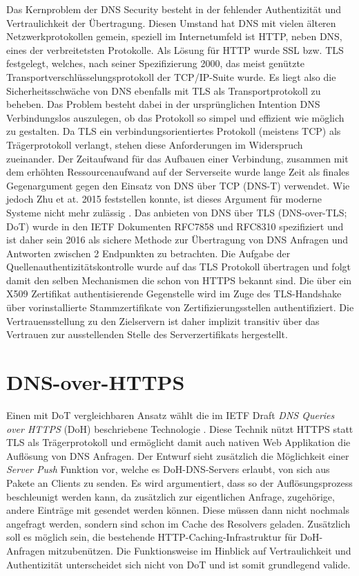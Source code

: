 Das Kernproblem der DNS Security besteht in der fehlender Authentizität und Vertraulichkeit der Übertragung. Diesen Umstand hat DNS mit vielen älteren Netzwerkprotokollen gemein, speziell im Internetumfeld ist HTTP, neben DNS, eines der verbreitetsten Protokolle. Als Lösung für HTTP wurde SSL bzw. TLS festgelegt, welches, nach seiner Spezifizierung 2000, das meist genützte Transportverschlüsselungsprotokoll der TCP/IP-Suite wurde. Es liegt also die Sicherheitsschwäche von DNS ebenfalls mit TLS als Transportprotokoll zu beheben. Das Problem besteht dabei in der ursprünglichen Intention DNS Verbindungslos auszulegen, ob das Protokoll so simpel und effizient wie möglich zu gestalten. Da TLS ein verbindungsorientiertes Protokoll (meistens TCP) als Trägerprotokoll verlangt, stehen diese Anforderungen im Widerspruch zueinander. Der Zeitaufwand für das Aufbauen einer Verbindung, zusammen mit dem erhöhten Ressourcenaufwand auf der Serverseite wurde lange Zeit als finales Gegenargument gegen den Einsatz von DNS über TCP (DNS-T) verwendet. Wie jedoch Zhu et at. 2015 feststellen konnte, ist dieses Argument für moderne Systeme nicht mehr zulässig \cite{Zhu2015}. Das anbieten von DNS über TLS (DNS-over-TLS; DoT) wurde in den IETF Dokumenten RFC7858\cite{Hu2016} und RFC8310\cite{Dickinson2018} spezifiziert und ist daher sein 2016 als sichere Methode zur Übertragung von DNS Anfragen und Antworten zwischen 2 Endpunkten zu betrachten. Die Aufgabe der Quellenauthentizitätskontrolle wurde auf das TLS Protokoll übertragen und folgt damit den selben Mechanismen die schon von HTTPS bekannt sind. Die über ein X509 Zertifikat authentisierende Gegenstelle wird im Zuge des TLS-Handshake über vorinstallierte Stammzertifikate von Zertifizierungsstellen authentifiziert. Die Vertrauensstellung zu den Zielservern ist daher implizit transitiv über das Vertrauen zur ausstellenden Stelle des Serverzertifikats hergestellt.        

\section{DNS-over-HTTPS}

Einen mit DoT vergleichbaren Ansatz wählt die im IETF Draft \textit{DNS Queries over HTTPS} (DoH) beschriebene Technologie \cite{Mcmanus2018}. Diese Technik nützt HTTPS statt TLS als Trägerprotokoll und ermöglicht damit auch nativen Web Applikation die Auflösung von DNS Anfragen. Der Entwurf sieht zusätzlich die Möglichkeit einer \textit{Server Push} Funktion vor, welche es DoH-DNS-Servers erlaubt, von sich aus Pakete an Clients zu senden. Es wird argumentiert, dass so der Auflösungsprozess beschleunigt werden kann, da zusätzlich zur eigentlichen Anfrage, zugehörige, andere Einträge mit gesendet werden können. Diese müssen dann nicht nochmals angefragt werden, sondern sind schon im Cache des Resolvers geladen. Zusätzlich soll es möglich sein, die bestehende HTTP-Caching-Infrastruktur für DoH-Anfragen mitzubenützen. Die Funktionsweise im Hinblick auf Vertraulichkeit und Authentizität unterscheidet sich nicht von DoT und ist somit grundlegend valide.

